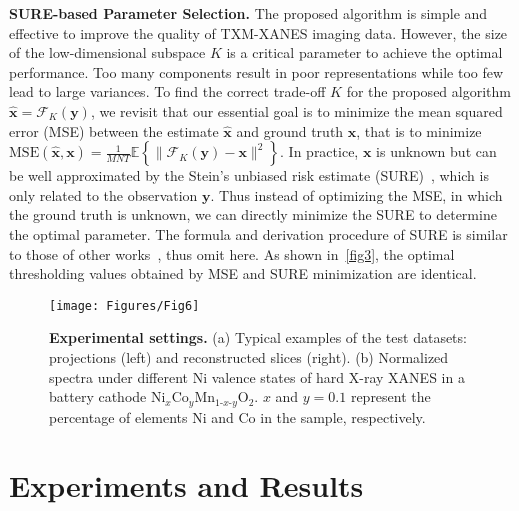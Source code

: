 \documentclass[10pt,twocolumn,letterpaper]{article}
\begin{document}
\textbf{SURE-based Parameter Selection.} The proposed algorithm is simple and effective to improve the quality of TXM-XANES imaging data. However, the size of the low-dimensional subspace $K$ is a critical parameter to achieve the optimal performance. Too many components result in poor representations while too few lead to large variances. To find the correct trade-off $K$ for the proposed algorithm $\mathrm{\mathbf{\hat{x}}} = \mathcal{F}_K(\mathrm{\mathbf{{y}}})$, we revisit that our essential goal is to minimize the mean squared error (MSE) between the estimate $\mathrm{\mathbf{\hat{x}}}$ and ground truth $\mathrm{\mathbf{{x}}}$, that is to minimize 
$
\label{MSE}
    \mathrm{MSE} (\mathrm{\mathbf{\hat{x}}},\mathrm{\mathbf{{x}}}) = \frac{1}{MNT}\mathbb{E}\left\{\|\mathcal{F}_K (\mathrm{\mathbf{y}}) - \mathrm{\mathbf{x}}\|^2\right\}.
$ In practice, $\mathrm{\mathbf{x}}$ is unknown but  can be well approximated by the Stein’s unbiased risk estimate (SURE)~\cite{stein1981estimation}, which is only related to the observation $\mathrm{\mathbf{y}}$. Thus instead of optimizing the MSE, in which the ground truth is unknown, we can directly minimize the SURE to determine the optimal parameter. The formula and derivation procedure of SURE is similar to those of other works~\cite{blu2007sure,li2017pure,luisier2010sure}, thus omit here. As shown in~\cref{fig3}, the optimal thresholding values obtained by MSE and SURE minimization are identical. 

\begin{figure}
  \centering
    \texttt{[image: Figures/Fig6]}
    \vspace{-6pt}
    \caption{\textbf{Experimental settings.} (a) Typical examples of the test datasets: projections (left) and reconstructed slices (right). (b) Normalized spectra under different Ni valence states of hard X-ray XANES in a battery cathode $\mathrm{Ni}_x\mathrm{Co}_y\mathrm{Mn}_{1\text{-}x\text{-}y}\mathrm{O}_2$. $x$ and $y=0.1$ represent the percentage of elements Ni and Co in the sample, respectively.}
    \vspace{-15pt}
    \label{fig6}
\end{figure} 
\vspace{-5pt}
\section{Experiments and Results}
\end{document}
